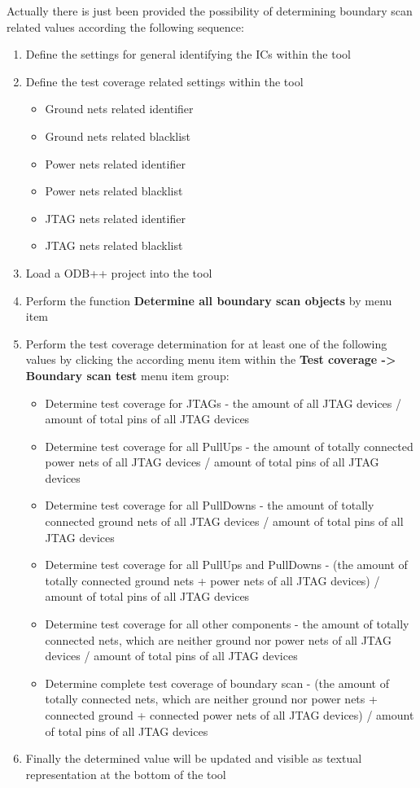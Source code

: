 Actually there is just been provided the possibility of determining boundary scan related values according the following sequence:
\begin{enumerate}
	\item Define the settings for general identifying the ICs within the tool
	\item Define the test coverage related settings within the tool
	\begin{itemize}
		\item Ground nets related identifier
		\item Ground nets related blacklist
		\item Power nets related identifier
		\item Power nets related blacklist
	  \item JTAG nets related identifier
		\item JTAG nets related blacklist
	\end{itemize}
	\item Load a \ac{ODB}++ project into the tool
	\item Perform the function \textbf{Determine all boundary scan objects} by menu item
	\item Perform the test coverage determination for at least one of the following values by clicking the according menu item within the \textbf{Test coverage -> Boundary scan test} menu item group:
	\begin{itemize}
		\item Determine test coverage for \ac{JTAG}s - the amount of all \ac{JTAG} devices / amount of total pins of all \ac{JTAG} devices
		\item Determine test coverage for all PullUps - the amount of totally connected power nets of all \ac{JTAG} devices / amount of total pins of all \ac{JTAG} devices
		\item Determine test coverage for all PullDowns - the amount of totally connected ground nets of all \ac{JTAG} devices / amount of total pins of all \ac{JTAG} devices
		\item Determine test coverage for all PullUps and PullDowns - (the amount of totally connected ground nets + power nets of all \ac{JTAG} devices) / amount of total pins of all \ac{JTAG} devices
		\item Determine test coverage for all other components - the amount of totally connected nets, which are neither ground nor power nets of all \ac{JTAG} devices / amount of total pins of all \ac{JTAG} devices
		\item Determine complete test coverage of boundary scan - (the amount of totally connected nets, which are neither ground nor power nets + connected ground + connected power nets of all \ac{JTAG} devices) / amount of total pins of all \ac{JTAG} devices
	\end{itemize}
	\item Finally the determined value will be updated and visible as textual representation at the bottom of the tool
\end{enumerate}

